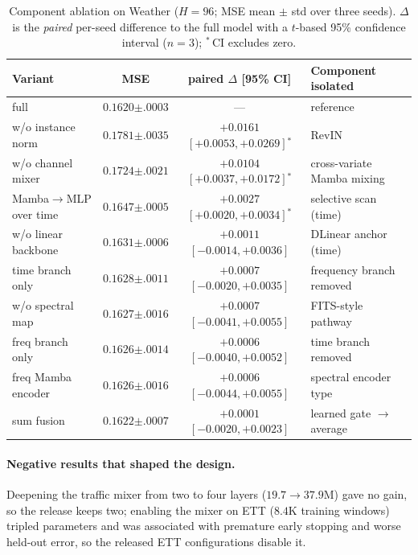 \documentclass[runningheads]{llncs}
\begin{document}
\begin{table}[tb]
\centering
\caption{Component ablation on Weather ($H{=}96$; MSE mean $\pm$ std over
three seeds). $\Delta$ is the \emph{paired} per-seed difference to the
full model with a $t$-based 95\% confidence interval ($n{=}3$);
$^{*}$\,CI excludes zero.}
\label{tab:ablation_weather}
\scriptsize
\setlength{\tabcolsep}{3pt}
\begin{tabular}{@{}lccl@{}}
\toprule
Variant & MSE & paired $\Delta$ [95\% CI] & Component isolated \\
\midrule
full & $0.1620{\scriptstyle\pm.0003}$ & --- & reference \\
\;\;w/o instance norm & $0.1781{\scriptstyle\pm.0035}$ & $+0.0161$ $[+0.0053,+0.0269]$$^{*}$ & RevIN \\
\;\;w/o channel mixer & $0.1724{\scriptstyle\pm.0021}$ & $+0.0104$ $[+0.0037,+0.0172]$$^{*}$ & cross-variate Mamba mixing \\
\;\;Mamba$\rightarrow$MLP over time & $0.1647{\scriptstyle\pm.0005}$ & $+0.0027$ $[+0.0020,+0.0034]$$^{*}$ & selective scan (time) \\
\;\;w/o linear backbone & $0.1631{\scriptstyle\pm.0006}$ & $+0.0011$ $[-0.0014,+0.0036]$ & DLinear anchor (time) \\
\;\;time branch only & $0.1628{\scriptstyle\pm.0011}$ & $+0.0007$ $[-0.0020,+0.0035]$ & frequency branch removed \\
\;\;w/o spectral map & $0.1627{\scriptstyle\pm.0016}$ & $+0.0007$ $[-0.0041,+0.0055]$ & FITS-style pathway \\
\;\;freq branch only & $0.1626{\scriptstyle\pm.0014}$ & $+0.0006$ $[-0.0040,+0.0052]$ & time branch removed \\
\;\;freq Mamba encoder & $0.1626{\scriptstyle\pm.0016}$ & $+0.0006$ $[-0.0044,+0.0055]$ & spectral encoder type \\
\;\;sum fusion & $0.1622{\scriptstyle\pm.0007}$ & $+0.0001$ $[-0.0020,+0.0023]$ & learned gate $\rightarrow$ average \\
\bottomrule
\end{tabular}
\end{table}

\paragraph{Negative results that shaped the design.} Deepening the traffic
mixer from two to four layers ($19.7\rightarrow37.9$M) gave no gain, so the
release keeps two; enabling the mixer on ETT ($8.4$K training windows)
tripled parameters and was associated with premature early stopping and
worse held-out error, so the released ETT configurations disable it.
\end{document}

